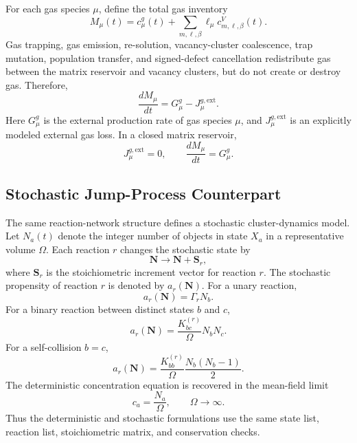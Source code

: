 For each gas species $\mu$, define the total gas inventory
\begin{equation}
    M_\mu(t)
    =
    c^g_\mu(t)
    +
    \sum_{m,\boldsymbol{\ell},\beta}
    \ell_\mu c^V_{m,\boldsymbol{\ell},\beta}(t).
    \label{eq:gas_inventory_general}
\end{equation}
Gas trapping, gas emission, re-solution, vacancy-cluster coalescence, trap
mutation, population transfer, and signed-defect cancellation redistribute gas
between the matrix reservoir and vacancy clusters, but do not create or destroy
gas. Therefore,
\begin{equation}
    \boxed{
    \frac{dM_\mu}{dt}
    =
    G^g_\mu
    -
    J^{g,\mathrm{ext}}_\mu .
    }
    \label{eq:gas_species_conservation}
\end{equation}
Here $G^g_\mu$ is the external production rate of gas species $\mu$, and
$J^{g,\mathrm{ext}}_\mu$ is an explicitly modeled external gas loss. In a
closed matrix reservoir,
\begin{equation}
    J^{g,\mathrm{ext}}_\mu=0,
    \qquad
    \frac{dM_\mu}{dt}=G^g_\mu .
\end{equation}

\subsection{Stochastic Jump-Process Counterpart}
\label{sec:stochastic_jump_process_counterpart}

The same reaction-network structure defines a stochastic cluster-dynamics
model. Let $N_a(t)$ denote the integer number of objects in state $X_a$ in a
representative volume $\Omega$. Each reaction $r$ changes the stochastic state
by
\begin{equation}
    \mathbf{N}
    \longrightarrow
    \mathbf{N}+\mathbf{S}_r,
\end{equation}
where $\mathbf{S}_r$ is the stoichiometric increment vector for reaction $r$.
The stochastic propensity of reaction $r$ is denoted by $a_r(\mathbf{N})$.
For a unary reaction,
\begin{equation}
    a_r(\mathbf{N}) = \Gamma_r N_b .
\end{equation}
For a binary reaction between distinct states $b$ and $c$,
\begin{equation}
    a_r(\mathbf{N})
    =
    \frac{K^{(r)}_{bc}}{\Omega}N_bN_c .
\end{equation}
For a self-collision $b=c$,
\begin{equation}
    a_r(\mathbf{N})
    =
    \frac{K^{(r)}_{bb}}{\Omega}
    \frac{N_b(N_b-1)}{2} .
\end{equation}
The deterministic concentration equation is recovered in the mean-field limit
\begin{equation}
    c_a = \frac{N_a}{\Omega},
    \qquad
    \Omega\rightarrow\infty .
\end{equation}
Thus the deterministic and stochastic formulations use the same state list,
reaction list, stoichiometric matrix, and conservation checks.

